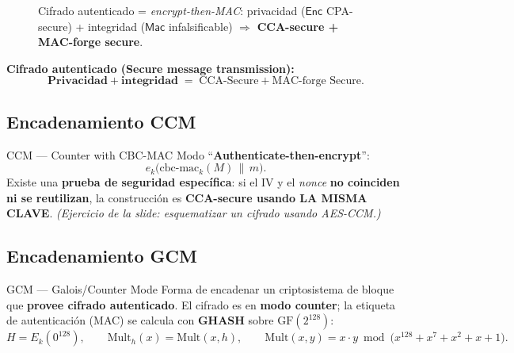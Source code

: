 \documentclass[11pt,a4paper]{article}
\newcommand{\concat}{\,\|\,}
\newcommand{\Mac}{\mathsf{Mac}}
\newcommand{\Enc}{\mathsf{Enc}}
\begin{document}
\begin{figure}[h]
\centering
{}
\caption{Cifrado autenticado = \emph{encrypt-then-MAC}: privacidad ($\Enc$ CPA-secure) +
integridad ($\Mac$ infalsificable) $\Rightarrow$ \textbf{CCA-secure + MAC-forge secure}.}
\end{figure}

\begin{slidebox}
\textbf{Cifrado autenticado (Secure message transmission):}
\[
  \textbf{Privacidad} + \textbf{integridad} \;=\; \text{CCA-Secure} + \text{MAC-forge Secure}.
\]
\end{slidebox}

\subsection{Encadenamiento CCM}
\begin{defbox}{CCM — Counter with CBC-MAC}
Modo ``\textbf{Authenticate-then-encrypt}'':
\[
  e_k\bigl(\text{cbc-mac}_k(M)\concat m\bigr).
\]
Existe una \textbf{prueba de seguridad específica}: si el IV y el \emph{nonce} \textbf{no
coinciden ni se reutilizan}, la construcción es \textbf{CCA-secure usando LA MISMA CLAVE}.
\emph{(Ejercicio de la slide: esquematizar un cifrado usando AES-CCM.)}
\end{defbox}

\subsection{Encadenamiento GCM}
\begin{defbox}{GCM — Galois/Counter Mode}
Forma de encadenar un criptosistema de bloque que \textbf{provee cifrado autenticado}. El
cifrado es en \textbf{modo counter}; la etiqueta de autenticación (MAC) se calcula con
\textbf{GHASH} sobre $\mathrm{GF}(2^{128})$:
\[
  H=E_k(0^{128}),\qquad \mathrm{Mult}_h(x)=\mathrm{Mult}(x,h),\qquad
  \mathrm{Mult}(x,y)=x\cdot y \bmod \bigl(x^{128}+x^7+x^2+x+1\bigr).
\]
\end{defbox}
\end{document}

